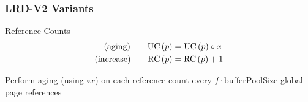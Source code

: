 





\begin{frame}
    \frametitle{LRD-V2 Variants}

    \begin{block}{Reference Counts}
        \vspace{-2em}
        \begin{align*}
            \text{(aging)\qquad}\text{UC}\left(p\right) &= \text{UC}\left(p\right) \circ x\\
            \text{(increase)\qquad}\text{RC}\left(p\right) &= \text{RC}\left(p\right) + 1
        \end{align*}
        \vspace{-1.5em}
    \end{block}

    \begin{description}
        \item<2->[$f \circ x$]  Perform aging (using $\circ x$) on each reference count every $f \cdot \text{bufferPoolSize}$ global page references
    \end{description}
\end{frame}

